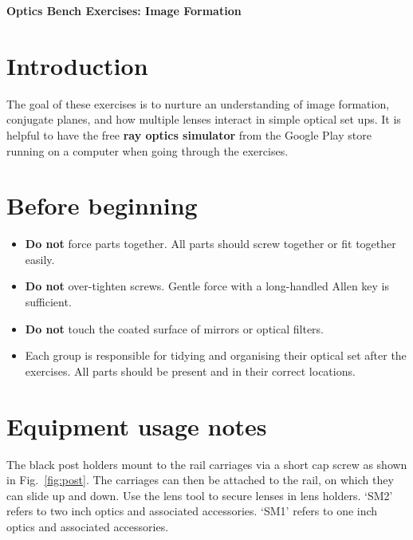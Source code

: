 \documentclass[a4paper]{report}
\begin{document}
\setcounter{secnumdepth}{2}

\begin{center}
\textbf{\Large{Optics Bench Exercises: Image Formation}}
\end{center}

\section{Introduction}
The goal of these exercises is to nurture an understanding of image formation, conjugate planes, and how multiple lenses interact in simple optical set ups.
It is helpful to have the free \textbf{ray optics simulator} from the Google Play store running on a computer when going through the exercises. 


\section{Before beginning}
\begin{itemize}
    \item \textbf{Do not} force parts together. All parts should screw together or fit together easily.
    \item \textbf{Do not} over-tighten screws. Gentle force with a long-handled Allen key is sufficient. 
    \item \textbf{Do not} touch the coated surface of mirrors or optical filters. 
    \item Each group is responsible for tidying and organising their optical set after the exercises. All parts should be present and in their correct locations. 

\end{itemize}

\section{Equipment usage notes}
The black post holders mount to the rail carriages via a short cap screw as shown in Fig.~\ref{fig:post}. 
The carriages can then be attached to the rail, on which they can slide up and down. 
Use the lens tool to secure lenses in lens holders. 
`SM2' refers to two inch optics and associated accessories. 
`SM1' refers to one inch optics and associated accessories. 
\end{document}
